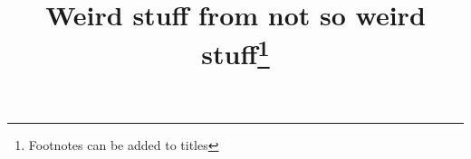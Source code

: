 \documentclass[linenumbers,trackchanges,twocolumn]{aastex701}
\begin{document}
\title{Weird stuff from not so weird stuff\footnote{Footnotes can be added to titles}}

\end{document}
